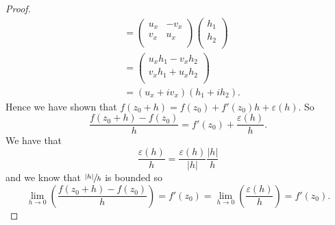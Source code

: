 \begin{proof}
\begin{align*}
            &=
            \begin{pmatrix}
                u_x & -v_x \\
                v_x & u_x  \\
            \end{pmatrix}
            \begin{pmatrix}
                h_1 \\
                h_2 \\
            \end{pmatrix}
            \\
            &= 
            \begin{pmatrix}
                u_x h_1 - v_x h_2 \\
                v_x h_1 + u_x h_2 \\
            \end{pmatrix}
            \\
            &= (u_x + iv_x)(h_1 + ih_2).
    \end{align*}
    Hence we have shown that $f(z_0 + h) = f(z_0) + f'(z_0)h + \varepsilon(h)$. So
    \[ \frac{f(z_0 + h) - f(z_0)}{h} = f'(z_0) + \frac{\varepsilon(h)}{h}. \]
    We have that
    \[ \frac{\varepsilon(h)}{h} = \frac{\varepsilon(h)}{\lvert h \rvert} \frac{\lvert h \rvert}{h} \]
    and we know that $\sfrac{\lvert h \rvert}h$ is bounded so
    \[ \lim_{h \to 0} \left(\frac{f(z_0 + h) - f(z_0)}{h}\right) = f'(z_0) = \lim_{h \to 0} \left(\frac{\varepsilon(h)}{h}\right) = f'(z_0). \]
\end{proof}

